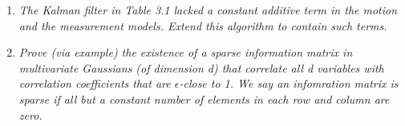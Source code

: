 \documentclass[10pt]{article}
\begin{document}
\begin{enumerate}
  \item \textit{The Kalman filter in Table 3.1 lacked a constant additive term
      in the motion and the measurement models. Extend this algorithm to contain
      such terms.}

  \item \textit{Prove (via example) the existence of a sparse information
      matrix in multivariate Gaussians (of dimension d) that correlate all d
      variables with correlation coefficients that are $\epsilon$-close to 1. We
      say an infomration matrix is sparse if all but a constant number of elements
      in each row and column are zero.}
\end{enumerate}
\end{document}
